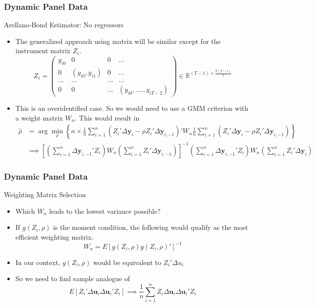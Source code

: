 \documentclass{beamer}
\begin{document}
\begin{frame}
\frametitle{Dynamic Panel Data}
Arellano-Bond Estimator: No regressors
\begin{itemize}
\item The generalized approach using matrix will be similar except for the instrument matrix $Z_i$.
\[
Z_i = \begin{pmatrix}y_{i0}& 0 & 0 & ... \\ 0 & (y_{i0},y_{i1})& 0 & ... \\ ... & ... &...&...\\ 0 & 0 & ... & (y_{i0},....,y_{iT-2}) \end{pmatrix}\in\mathbb{R}^{(T-1)\times \frac{T(T-1)}{2}}
\]
\item This is an overidentified case. So we would need to use a GMM criterion with a weight matrix $W_n$. This would result in
\footnotesize{\begin{align*}
\hat{\rho}&=\arg\min_\rho \left\{n\times \frac{1}{n}\sum_{i=1}^n(Z_i'\Delta \mathbf{y}_i - \rho Z_i'\Delta \mathbf{y}_{i,-1})'W_n  \frac{1}{n}\sum_{i=1}^n(Z_i'\Delta \mathbf{y}_i - \rho Z_i'\Delta \mathbf{y}_{i,-1})\right\}\\
&\implies \left[\left(\sum_{i=1}^n\Delta \mathbf{y}_{i,-1}' Z_i\right)W_n\left(\sum_{i=1}^n Z_i' \Delta \mathbf{y}_{i,-1}\right) \right]^{-1}\left(\sum_{i=1}^n\Delta \mathbf{y}_{i,-1}' Z_i\right)W_n\left(\sum_{i=1}^n Z_i' \Delta \mathbf{y}_i \right)
\end{align*}}\normalsize
\end{itemize}
\end{frame}

\begin{frame}
\frametitle{Dynamic Panel Data}
Weighting Matrix Selection
\begin{itemize}
\item Which $W_n$ leads to the lowest variance possible?
\item If $g(Z_i,\rho)$ is the moment condition, the following would qualify as the most efficient weighting matrix.
\[
W_n = E[g(Z_i,\rho)g(Z_i,\rho)']^{-1}
\]
\item In our context, $g(Z_i,\rho)$ would be equivalent to $Z_i'\Delta u_i$
\item So we need to find sample analogue of
\[
E[Z_i'\Delta \mathbf{u}_i \Delta \mathbf{u}_i'Z_i] \implies \frac{1}{n}\sum_{i=1}^nZ_i\Delta \mathbf{u}_i \Delta \mathbf{u}_i' Z_i
\]
\end{itemize}
\end{frame}
\end{document}
